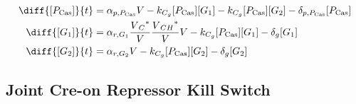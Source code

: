 \begin{align}
\diff{\conc{\proSp{\cas{}}}}{t} & =  \txtlRate{\proSp{\cas{}}}\vectorGen{} - \gRnaBind{}\conc{\proSp{\cas{}}}\conc{\gRna{1}} - \gRnaBind{}\conc{\proSp{\cas{}}}\conc{\gRna{2}} - \proDegradeRate{\proSp{\cas{}}}\conc{\proSp{\cas{}}}\\
\diff{\conc{\gRna{1}}}{t} & =  \txRate{\gRna{1}}\frac{\edited{\vectorGen{}_C}}{\vectorGen{}}\frac{\edited{\vectorGen{}_{CH}}}{\vectorGen{}}\vectorGen{} - \gRnaBind{}\conc{\proSp{\cas{}}}\conc{\gRna{1}} - \rnaDegradeRate{}\conc{\gRna{1}}\\
\diff{\conc{\gRna{2}}}{t} & =  \txRate{\gRna{2}}\vectorGen{} - \gRnaBind{}\conc{\proSp{\cas{}}}\conc{\gRna{2}} - \rnaDegradeRate{}\conc{\gRna{2}}
\end{align}

\subsection{Joint Cre-on Repressor Kill Switch}
\label{s:Joint_Cre_on_Repressor_Kill_Switch}


